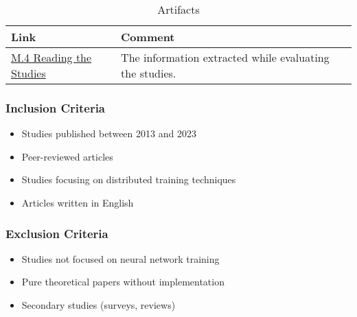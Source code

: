 





\begin{table*}[htbp]
    \centering 
    \caption{Artifacts}
    \label{tab:artefacts}
    \begin{tabularx}{\textwidth}{lXX}
        \hline
        \textbf{Link} & \textbf{Comment} \\
        \hline
        \href{https://1drv.ms/x/c/a7d18f02247e70f7/EU6EIrW0ubBBlxLX8JvVxjgBcGvPiTlZgRLTdLrM9-S4bw?e=os2ugX}{M.4 Reading the Studies} & 
        The information extracted while evaluating the studies. \\
        \hline
    \end{tabularx}
\end{table*}

\subsubsection{Inclusion Criteria}
\begin{itemize}
    \item Studies published between 2013 and 2023
    \item Peer-reviewed articles
    \item Studies focusing on distributed training techniques
    \item Articles written in English
\end{itemize}

\subsubsection{Exclusion Criteria}
\begin{itemize}
    \item Studies not focused on neural network training
    \item Pure theoretical papers without implementation
    \item Secondary studies (surveys, reviews)
\end{itemize}

